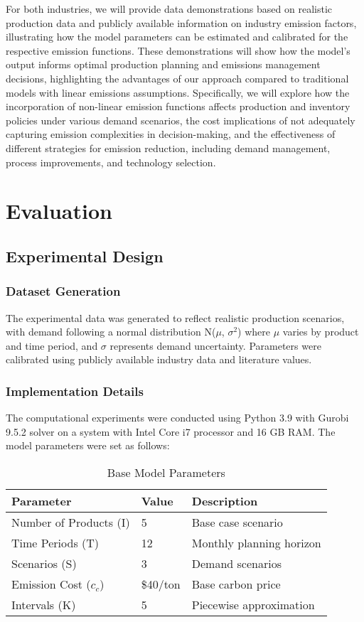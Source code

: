 \documentclass[final,3p,times,review,authoryear]{elsarticle}
\begin{document}
For both industries, we will provide data demonstrations based on realistic production data and publicly available information on industry emission factors, illustrating how the model parameters can be estimated and calibrated for the respective emission functions. These demonstrations will show how the model's output informs optimal production planning and emissions management decisions, highlighting the advantages of our approach compared to traditional models with linear emissions assumptions. Specifically, we will explore how the incorporation of non-linear emission functions affects production and inventory policies under various demand scenarios, the cost implications of not adequately capturing emission complexities in decision-making, and the effectiveness of different strategies for emission reduction, including demand management, process improvements, and technology selection.

\section{Evaluation}
\label{sec:eva}

\subsection{Experimental Design}
\subsubsection{Dataset Generation}
The experimental data was generated to reflect realistic production scenarios, with demand following a normal distribution N($\mu$, $\sigma^2$) where $\mu$ varies by product and time period, and $\sigma$ represents demand uncertainty. Parameters were calibrated using publicly available industry data and literature values.

\subsubsection{Implementation Details}
The computational experiments were conducted using Python 3.9 with Gurobi 9.5.2 solver on a system with Intel Core i7 processor and 16 GB RAM. The model parameters were set as follows:

\begin{table}[htbp]
    \centering
    \caption{Base Model Parameters}
    \label{tab:model_parameters}
    \begin{tabular}{lll}
        \toprule
        Parameter & Value & Description \\
        \midrule
        Number of Products (I) & 5 & Base case scenario \\
        Time Periods (T) & 12 & Monthly planning horizon \\
        Scenarios (S) & 3 & Demand scenarios \\
        Emission Cost ($c_c$) & \$40/ton & Base carbon price \\
        Intervals (K) & 5 & Piecewise approximation \\
        \bottomrule
    \end{tabular}
\end{table}
\end{document}
